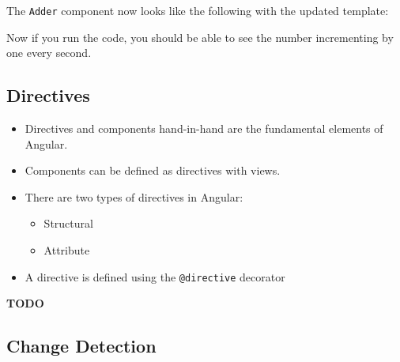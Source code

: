 \documentclass[12pt,]{article}
\newenvironment{Shaded}{}{}
\newcommand{\StringTok}[1]{\textcolor[rgb]{0.00,0.50,0.50}{{#1}}}
\newcommand{\FunctionTok}[1]{{#1}}
\newcommand{\NormalTok}[1]{{#1}}
\providecommand{\tightlist}{%
  \setlength{\itemsep}{0pt}\setlength{\parskip}{0pt}}
\begin{document}
The \texttt{Adder} component now looks like the following with the
updated template:

\begin{Shaded}
\end{Shaded}

Now if you run the code, you should be able to see the number
incrementing by one every second.

\subsection{Directives}\label{directives}

\begin{itemize}
\tightlist
\item
  Directives and components hand-in-hand are the fundamental elements of
  Angular.
\item
  Components can be defined as directives with views.
\item
  There are two types of directives in Angular:

  \begin{itemize}
  \tightlist
  \item
    Structural
  \item
    Attribute
  \end{itemize}
\item
  A directive is defined using the \texttt{@directive} decorator
\end{itemize}

\textbf{TODO}

\subsection{Change Detection}\label{change-detection}
\end{document}

